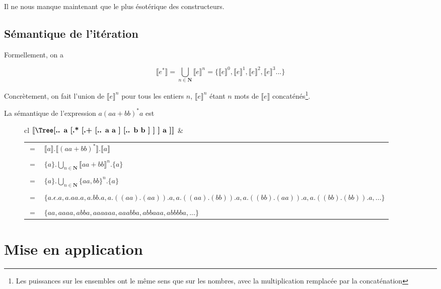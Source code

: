Il ne nous manque maintenant que le plus ésotérique des constructeurs.

\subsection{Sémantique de l'itération}

Formellement, on a 

\[\llbracket e^* \rrbracket = \bigcup_{n \in \mathbf{N}} \llbracket e \rrbracket^n = \{\llbracket e \rrbracket^0, \llbracket e \rrbracket^1, \llbracket e \rrbracket^2, \llbracket e \rrbracket^3 ...\}\]


Concrètement, on fait l'union de $\llbracket e \rrbracket^n$ pour tous les entiers $n$, $\llbracket e \rrbracket^n$ étant $n$ mots de $\llbracket e \rrbracket$ concaténés\footnote{Les puissances sur les ensembles ont le même sens que sur les nombres, avec la multiplication remplacée par la concaténation}.

\begin{example}
La sémantique de l'expression $a(aa+bb)^*a$ est
\begin{figure}[h]
\hspace{-2cm}
\begin{tabular}{cl}
$\mt{\Tree[.{.} a [.{*} [.{+} [.{.} a a ] [.{.} b b ] ] ] a ]}$ &
\begin{tabular}{ll}
$=$& $\llbracket a \rrbracket . \llbracket (aa+bb)^* \rrbracket . \llbracket a \rrbracket$ \\ & \\ $=$ & $\{a\} . \bigcup_{n \in \mathbf{N}} \llbracket aa+bb \rrbracket^n . \{a\}$ \\ & \\ $=$ & $\{a\} . \bigcup_{n \in \mathbf{N}} \{aa,bb\}^n . \{a\}$ \\ 
& \\
$=$ & $\{a.\epsilon.a, a.aa.a, a.bb.a, a.((aa).(aa)).a, a.((aa).(bb)).a, a.((bb).(aa)).a, a.((bb).(bb)).a, ...\}$ \\
&\\
$=$ & $\{aa, aaaa, abba, aaaaaa, aaabba, abbaaa, abbbba, ...\}$
\end{tabular} \end{tabular}
\end{figure}
\end{example}

\section{Mise en application}

